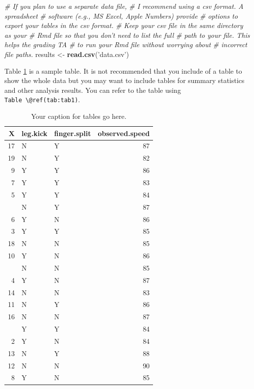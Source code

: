 \documentclass[
]{article}
\newenvironment{Shaded}{\begin{snugshade}}{\end{snugshade}}
\newcommand{\CommentTok}[1]{\textcolor[rgb]{0.56,0.35,0.01}{\textit{#1}}}
\newcommand{\KeywordTok}[1]{\textcolor[rgb]{0.13,0.29,0.53}{\textbf{#1}}}
\newcommand{\NormalTok}[1]{#1}
\newcommand{\StringTok}[1]{\textcolor[rgb]{0.31,0.60,0.02}{#1}}
\begin{document}
\begin{Shaded}
\begin{Highlighting}[]
\CommentTok{# If you plan to use a separate data file,}
\CommentTok{# I recommend using a csv format. A spreadsheet}
\CommentTok{# software (e.g., MS Excel, Apple Numbers) provide}
\CommentTok{# options to export your tables in the csv format.}
\CommentTok{# Keep your csv file in the same directory as your}
\CommentTok{# Rmd file so that you don't need to list the full}
\CommentTok{# path to your file. This helps the grading TA}
\CommentTok{# to run your Rmd file without worrying about}
\CommentTok{# incorrect file paths.}
\NormalTok{results <-}\StringTok{ }\KeywordTok{read.csv}\NormalTok{(}\StringTok{'data.csv'}\NormalTok{)}
\end{Highlighting}
\end{Shaded}

Table \ref{tab:tab1} is a sample table. It is not recommended that you include of a table to show the whole data but you may want to include tables for summary statistics and other analysis results. You can refer to the table using \texttt{Table\ \textbackslash{}@ref(tab:tab1)}.

\begin{table}

\caption{\label{tab:tab1}Your caption for tables go here.}
\centering
\begin{tabular}[t]{rllr}
\toprule
X & leg.kick & finger.split & observed.speed\\
\midrule
17 & N & Y & 87\\
19 & N & Y & 82\\
9 & Y & Y & 86\\
7 & Y & Y & 83\\
5 & Y & Y & 84\\
\addlinespace
15 & N & Y & 87\\
6 & Y & N & 86\\
3 & Y & Y & 85\\
18 & N & N & 85\\
10 & Y & N & 86\\
\addlinespace
20 & N & N & 85\\
4 & Y & N & 87\\
14 & N & N & 83\\
11 & N & Y & 86\\
16 & N & N & 87\\
\addlinespace
1 & Y & Y & 84\\
2 & Y & N & 84\\
13 & N & Y & 88\\
12 & N & N & 90\\
8 & Y & N & 85\\
\bottomrule
\end{tabular}
\end{table}
\end{document}
